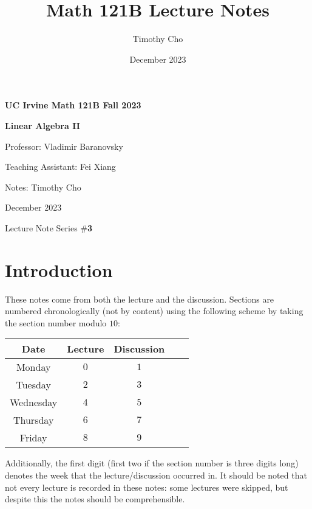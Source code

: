 \documentclass{article}
\title{Math 121B Lecture Notes}
\author{Timothy Cho}
\date{December 2023}
\begin{document}
\begin{titlepage}
    \begin{center}
        \vspace*{1cm}
            
        \Huge
        \textbf{UC Irvine Math 121B Fall 2023}
        
        \vspace{0.1 cm}
        \huge
        \textbf{Linear Algebra II}
        \vspace{0.4cm}
            
        \vspace{1.5cm}
        \Large    
        \textsf{Professor: Vladimir Baranovsky}

        \textsf{Teaching Assistant: Fei Xiang}
        
        \textsf{Notes: Timothy Cho}
            
        \vfill
            

            
        \vspace{0.8cm}
            

        \Large
        December 2023

        Lecture Note Series \#\textbf{3}
            
    \end{center}
\end{titlepage}
\section*{Introduction}
These notes come from both the lecture and the discussion. Sections are numbered chronologically (not by content) using the following scheme by taking the section number modulo $10$:
\begin{center}
\begin{tabular}{|c|c|c|c|c|}\hline
Date & Lecture & Discussion \\ \hline
Monday & $0$ & $1$  \\
Tuesday & $2$ & $3$ \\
Wednesday & $4$ & $5$ \\
Thursday & $6$ & $7$ \\
Friday & $8$ & $9$ \\ \hline
\end{tabular}
\end{center}
Additionally, the first digit (first two if the section number is three digits long) denotes the week that the lecture/discussion occurred in. It should be noted that not every lecture is recorded in these notes: some lectures were skipped, but despite this the notes should be comprehensible.
\end{document}
